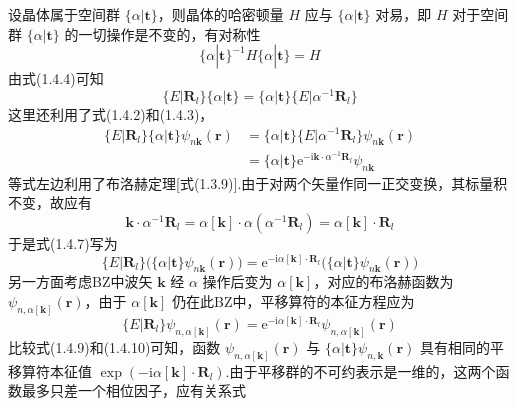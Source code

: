 设晶体属于空间群 $\{\alpha|\boldsymbol{t}\}$，则晶体的哈密顿量 $H$ 应与 $\{\alpha|\boldsymbol{t}\}$ 对易，即 $H$ 对于空间群 $\{\alpha|\boldsymbol{t}\}$ 的一切操作是不变的，有对称性
\begin{equation}
  \{\alpha|\boldsymbol{t}\}^{-1}H\{\alpha|\boldsymbol{t}\}=H
\end{equation}
由式(1.4.4)可知
\begin{equation}
  \{E|\boldsymbol{R}_l\}\{\alpha|\boldsymbol{t}\}
  =\{\alpha|\boldsymbol{t}\}\{E|\alpha^{-1}\boldsymbol{R}_l\}
\end{equation}
这里还利用了式(1.4.2)和(1.4.3)，
\begin{equation}
\begin{aligned}
  \{E|\boldsymbol{R}_l\}\{\alpha|\boldsymbol{t}\}\psi_{n\boldsymbol{k}}(\boldsymbol{r})
  &=\{\alpha|\boldsymbol{t}\}\{E|\alpha^{-1}\boldsymbol{R}_l\}\psi_{n\boldsymbol{k}}(\boldsymbol{r})\\
  &=\{\alpha|\boldsymbol{t}\}\mathrm{e}^{-\mathrm{i}\boldsymbol{k}\cdot\alpha^{-1}\boldsymbol{R}_l}\psi_{n\boldsymbol{k}}
\end{aligned}
\end{equation}
等式左边利用了布洛赫定理[式(1.3.9)].由于对两个矢量作同一正交变换，其标量积不变，故应有
\begin{equation}
  \boldsymbol{k}\cdot\alpha^{-1}\boldsymbol{R}_l
  =\alpha[\boldsymbol{k}]\cdot\alpha(\alpha^{-1}\boldsymbol{R}_l)
  =\alpha[\boldsymbol{k}]\cdot\boldsymbol{R}_l
\end{equation}
于是式(1.4.7)写为
\begin{equation}
  \{E|\boldsymbol{R}_l\}\bigl(\{\alpha|\boldsymbol{t}\}\psi_{n\boldsymbol{k}}(\boldsymbol{r})\bigr)
  =\mathrm{e}^{-\mathrm{i}\alpha[\boldsymbol{k}]\cdot\boldsymbol{R}_l}
  \bigl(\{\alpha|\boldsymbol{t}\}\psi_{n\boldsymbol{k}}(\boldsymbol{r})\bigr)
\end{equation}
另一方面考虑BZ中波矢 $\boldsymbol{k}$ 经 $\alpha$ 操作后变为 $\alpha[\boldsymbol{k}]$，对应的布洛赫函数为 $\psi_{n,\alpha[\boldsymbol{k}]}(\boldsymbol{r})$，由于 $\alpha[\boldsymbol{k}]$ 仍在此BZ中，平移算符的本征方程应为
\begin{equation}
  \{E|\boldsymbol{R}_l\}\psi_{n,\alpha[\boldsymbol{k}]}(\boldsymbol{r})
  =\mathrm{e}^{-\mathrm{i}\alpha[\boldsymbol{k}]\cdot\boldsymbol{R}_l}
  \psi_{n,\alpha[\boldsymbol{k}]}(\boldsymbol{r})
\end{equation}
比较式(1.4.9)和(1.4.10)可知，函数 $\psi_{n,\alpha[\boldsymbol{k}]}(\boldsymbol{r})$ 与 $\{\alpha|\boldsymbol{t}\}\psi_{n,\boldsymbol{k}}(\boldsymbol{r})$ 具有相同的平移算符本征值 $\exp(-\mathrm{i}\alpha[\boldsymbol{k}]\cdot\boldsymbol{R}_l)$.由于平移群的不可约表示是一维的，这两个函数最多只差一个相位因子，应有关系式
